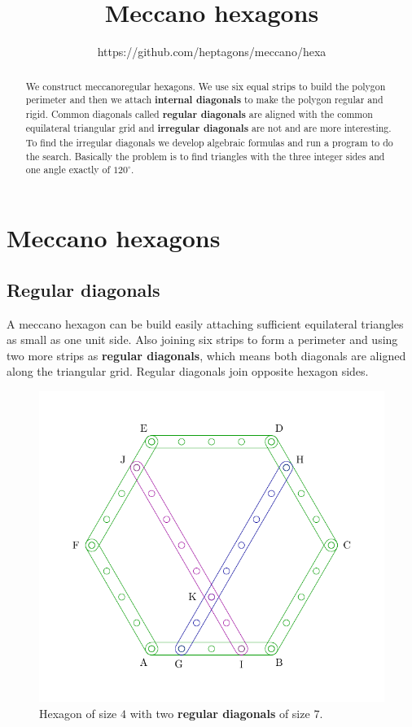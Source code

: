 \documentclass[11pt]{article}
\title{\textbf{Meccano hexagons}}
\author{https://github.com/heptagons/meccano/hexa}
\date{}
\begin{document}
\maketitle
\begin{abstract}
We construct meccano\meccanoref regular hexagons.
We use six equal strips to build the polygon perimeter and then we attach \textbf{internal diagonals} to make the polygon regular and rigid. Common diagonals called \textbf{
regular diagonals} are aligned with the common equilateral triangular grid and \textbf{
irregular diagonals} are not and are more interesting. To find the irregular diagonals
we develop algebraic formulas and run a program to do the search. Basically the problem
is to find triangles with the three integer sides and one angle exactly of $120^\circ{}$.
\end{abstract}

\section{Meccano hexagons}

\subsection {Regular diagonals}
A meccano hexagon can be build easily attaching sufficient equilateral
triangles as small as one unit side. 
Also joining six strips to form a perimeter and using two more strips as \textbf{regular diagonals},
which means both diagonals are aligned along the triangular grid.
Regular diagonals join opposite hexagon sides.

\begin{figure}[htpb]
\centering
\includegraphics[scale=0.75]{hexagon_simple}
\caption{Hexagon of size $4$ with two \textbf{regular diagonals} of size $7$.}
\label{fig:regular}
\end{figure}
\end{document}
